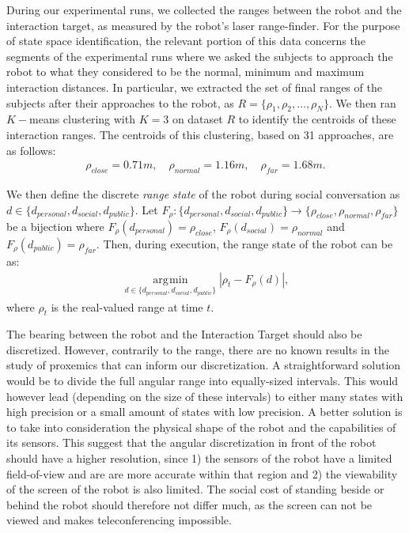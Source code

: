 \documentclass[a4paper,11pt]{report}
\DeclareMathOperator*{\argmin}{\arg\!\min}
\begin{document}
During our experimental runs, we collected the ranges between the robot and the interaction target, as measured by the robot's laser range-finder. For the purpose of state space identification, the relevant portion of this data concerns the segments of the experimental runs where we asked the subjects to approach the robot to what they considered to be the normal, minimum and maximum interaction distances. In particular, we extracted the set of final ranges of the subjects after their approaches to the robot, as $R = \{\rho_1, \rho_2,\ldots,\rho_N\}$. We then ran $K-$means clustering \cite{hartigan1979algorithm} with $K=3$ on dataset $R$ to identify the centroids of these interaction ranges. The centroids of this clustering, based on 31 approaches, are as follows:
\begin{align*}
\rho_{close} = 0.71m,\quad \rho_{normal} = 1.16m,\quad \rho_{far} = 1.68m.
\end{align*}


We then define the discrete \emph{range state} of the robot during social conversation as $d\in\{d_{personal},d_{social},d_{public}\}$.
 Let $F_{\rho}:\{d_{personal},d_{social},d_{public}\}\rightarrow\{\rho_{close}, \rho_{normal}, \rho_{far}\}$ be a bijection where $F_\rho(d_{personal}) = \rho_{close}$,  $F_\rho(d_{social}) = \rho_{normal}$ and  $F_\rho(d_{public}) = \rho_{far}$. Then, during execution, the range state of the robot can be as:
 \begin{align*}
   \argmin\limits_{d\in\{d_{personal},d_{social},d_{public}\}} |\rho_t-F_\rho(d)|,
 \end{align*}
where $\rho_t$ is the real-valued range at time $t$.

The bearing between the robot and the Interaction Target should also be discretized. However, contrarily to the range, there are no known results in the study of proxemics that can inform our discretization. A straightforward solution would be to divide the full angular range into equally-sized intervals. This would however lead (depending on the size of these intervals) to either many states with high precision or a small amount of states with low precision. A better solution is to take into consideration the physical shape of the robot and the capabilities of its sensors. This suggest that the angular discretization in front of the robot should have a higher resolution, since 1) the sensors of the robot have a limited field-of-view and are are more accurate within that region and 2) the viewability of the screen of the robot is also limited. The social cost of standing beside or behind the robot should therefore not differ much, as the screen can not be viewed and makes teleconferencing impossible.
\end{document}
